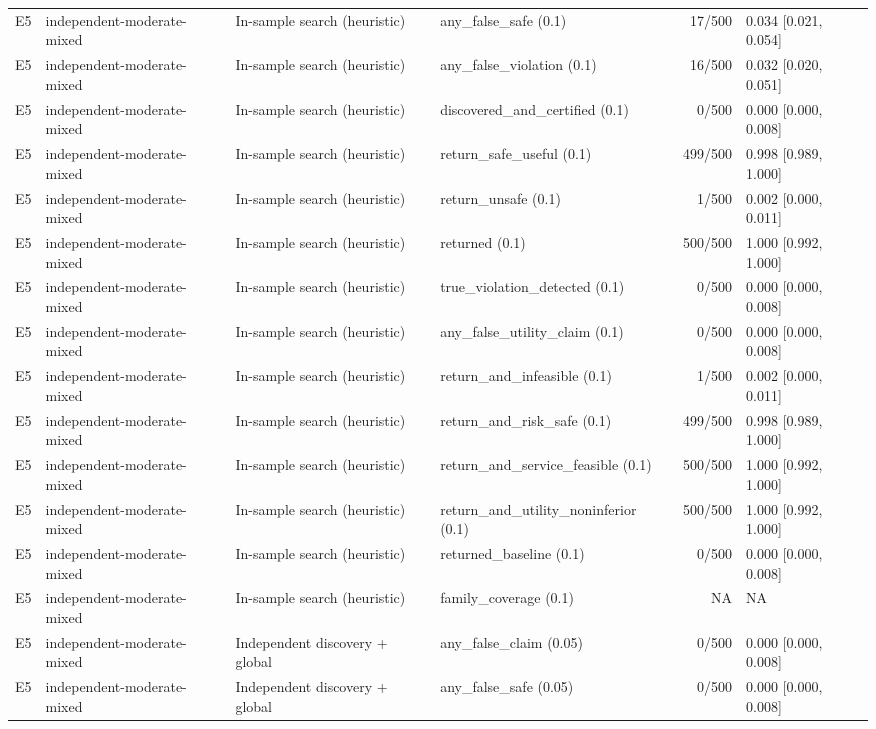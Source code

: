 \begin{longtable}{p{.04\linewidth}p{.18\linewidth}p{.19\linewidth}p{.16\linewidth}r p{.21\linewidth}}
E5 & independent-moderate-mixed & In-sample search (heuristic) & any\_false\_safe (0.1) & 17/500 & 0.034 [0.021, 0.054]\\
E5 & independent-moderate-mixed & In-sample search (heuristic) & any\_false\_violation (0.1) & 16/500 & 0.032 [0.020, 0.051]\\
E5 & independent-moderate-mixed & In-sample search (heuristic) & discovered\_and\_certified (0.1) & 0/500 & 0.000 [0.000, 0.008]\\
E5 & independent-moderate-mixed & In-sample search (heuristic) & return\_safe\_useful (0.1) & 499/500 & 0.998 [0.989, 1.000]\\
E5 & independent-moderate-mixed & In-sample search (heuristic) & return\_unsafe (0.1) & 1/500 & 0.002 [0.000, 0.011]\\
E5 & independent-moderate-mixed & In-sample search (heuristic) & returned (0.1) & 500/500 & 1.000 [0.992, 1.000]\\
E5 & independent-moderate-mixed & In-sample search (heuristic) & true\_violation\_detected (0.1) & 0/500 & 0.000 [0.000, 0.008]\\
E5 & independent-moderate-mixed & In-sample search (heuristic) & any\_false\_utility\_claim (0.1) & 0/500 & 0.000 [0.000, 0.008]\\
E5 & independent-moderate-mixed & In-sample search (heuristic) & return\_and\_infeasible (0.1) & 1/500 & 0.002 [0.000, 0.011]\\
E5 & independent-moderate-mixed & In-sample search (heuristic) & return\_and\_risk\_safe (0.1) & 499/500 & 0.998 [0.989, 1.000]\\
E5 & independent-moderate-mixed & In-sample search (heuristic) & return\_and\_service\_feasible (0.1) & 500/500 & 1.000 [0.992, 1.000]\\
E5 & independent-moderate-mixed & In-sample search (heuristic) & return\_and\_utility\_noninferior (0.1) & 500/500 & 1.000 [0.992, 1.000]\\
E5 & independent-moderate-mixed & In-sample search (heuristic) & returned\_baseline (0.1) & 0/500 & 0.000 [0.000, 0.008]\\
E5 & independent-moderate-mixed & In-sample search (heuristic) & family\_coverage (0.1) & NA & NA\\
E5 & independent-moderate-mixed & Independent discovery + global & any\_false\_claim (0.05) & 0/500 & 0.000 [0.000, 0.008]\\
E5 & independent-moderate-mixed & Independent discovery + global & any\_false\_safe (0.05) & 0/500 & 0.000 [0.000, 0.008]\\

\end{longtable}
